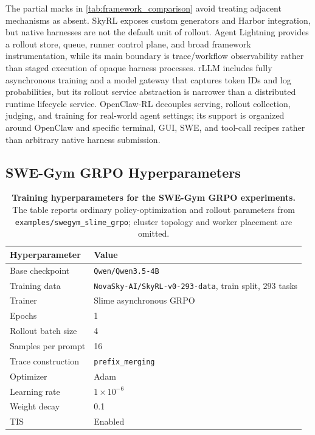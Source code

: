 The partial marks in \cref{tab:framework_comparison} avoid treating adjacent mechanisms as absent. SkyRL exposes custom generators and Harbor integration, but native harnesses are not the default unit of rollout. Agent Lightning provides a rollout store, queue, runner control plane, and broad framework instrumentation, while its main boundary is trace/workflow observability rather than staged execution of opaque harness processes. rLLM includes fully asynchronous training and a model gateway that captures token IDs and log probabilities, but its rollout service abstraction is narrower than a distributed runtime lifecycle service. OpenClaw-RL decouples serving, rollout collection, judging, and training for real-world agent settings; its support is organized around OpenClaw and specific terminal, GUI, SWE, and tool-call recipes rather than arbitrary native harness submission.

\subsection{SWE-Gym GRPO Hyperparameters}
\label{app:swegym_grpo_hparams}

\begin{table}[H]
\centering
\small
\setlength{\tabcolsep}{6pt}
\renewcommand{\arraystretch}{1.12}
\begin{tabular}{ll}
\toprule
\textbf{Hyperparameter} & \textbf{Value} \\
\midrule
Base checkpoint & \texttt{Qwen/Qwen3.5-4B} \\
Training data & \texttt{NovaSky-AI/SkyRL-v0-293-data}, train split, 293 tasks \\
Trainer & Slime asynchronous GRPO \\
Epochs & 1 \\
Rollout batch size & 4 \\
Samples per prompt & 16 \\
Trace construction & \texttt{prefix\_merging} \\
Optimizer & Adam \\
Learning rate & $1\times10^{-6}$ \\
Weight decay & 0.1 \\
TIS & Enabled \\
\bottomrule
\end{tabular}
\caption{\textbf{Training hyperparameters for the SWE-Gym GRPO experiments.} The table reports ordinary policy-optimization and rollout parameters from \texttt{examples/swegym\_slime\_grpo}; cluster topology and worker placement are omitted.}
\label{tab:swegym_grpo_hparams}
\end{table}

